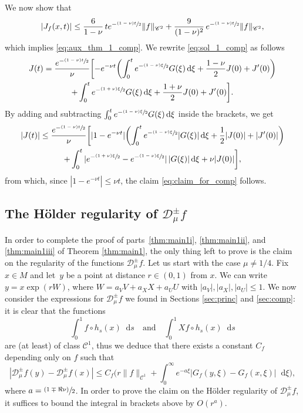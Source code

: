 \documentclass[11pt]{article}
\newcommand{\psfrac}[2]{\sfrac{(#1)}{#2}}
\newcommand{\tpsfrac}[3]{\sfrac{(#1)#3}{#2}}
\newcommand*{\diff}{\mathop{}\!\mathrm{d}}
\newcommand{\Dpm}[1]{\mathcal{D}_\mu^{\pm} #1}
\theoremstyle{definition}
\begin{document}
We now show that
\begin{equation}\label{eq:claim_for_comp}
|J_f(x,t)|\leq \frac{6}{1-\nu}\, t e^{-\tpsfrac{1-\nu}{2}t} \|f\|_{\mathscr{C}^2} + \frac{9}{(1-\nu)^2}\, e^{-\tpsfrac{1-\nu}{2}t} \|f\|_{\mathscr{C}^2},
\end{equation}
which implies \eqref{eq:aux_thm_1_comp}.
We rewrite \eqref{eq:sol_1_comp} as follows
\begin{multline*}
J(t) = \frac{e^{-\tpsfrac{1-\nu}{2}t}}{\nu} \biggl[- e^{-\nu t} \biggl(\int_0^t e^{-\tpsfrac{1-\nu}{2}\xi} G(\xi) \diff \xi + \frac{1-\nu}{2} J(0)+J'(0) \biggr) \\
+ \int_0^t e^{-\tpsfrac{1+\nu}{2}\xi} G(\xi) \diff \xi + \frac{1+\nu}{2} J(0) + J'(0) \biggr].
\end{multline*}
By adding and subtracting $\int_0^t e^{-\tpsfrac{1-\nu}{2}\xi} G(\xi) \diff \xi$ inside the brackets, we get
\begin{multline*}
|J(t)|\leq \frac{e^{-\tpsfrac{1-\nu}{2}t}}{\nu} \biggl[|1 - e^{-\nu t}|\biggl(\int_0^t e^{-\tpsfrac{1-\nu}{2}\xi} |G(\xi)|\diff \xi + \frac{1}{2} |J(0)|+|J'(0)|\biggr) \\
+ \int_0^t |e^{-\tpsfrac{1+\nu}{2}\xi} - e^{-\tpsfrac{1-\nu}{2}\xi}|\, |G(\xi)|\diff \xi + \nu |J(0)|\biggr],
\end{multline*}
from which, since $|1-e^{-\nu t}|\leq \nu t$, the claim \eqref{eq:claim_for_comp} follows.


\subsection{The Hölder regularity of $\Dpm{f}$}

In order to complete the proof of parts~\eqref{thm:main1i}, \eqref{thm:main1ii}, and \eqref{thm:main1iii} of Theorem \ref{thm:main1}, the only thing left to prove is the claim on the regularity of the functions $\Dpm{f}$.
Let us start with the case $\mu \neq 1/4$.
Fix $x \in M$ and let~$y$ be a point at distance $r \in (0,1)$ from $x$. We can write $y = x \exp(rW)$, where \hbox{$W = a_VV+a_XX+a_UU$} with $|a_V|, |a_X|, |a_U|\leq 1$.
We now consider the expressions for $\Dpm{f}$ we found in Sections \ref{sec:princ} and \ref{sec:comp}:
it is clear that the functions
\[
\int_0^1 f \circ h_s(x) \diff s \quad\text{and}\quad \int_0^1 Xf \circ h_s(x) \diff s
\]
are (at least) of class $\mathscr{C}^1$, thus we deduce that there exists a constant $C_f$ depending only on $f$ such that
\[
|\Dpm{f}(y) - \Dpm{f}(x)|\leq C_{f} \biggl(r \|f\|_{\mathscr{C}^1} + \int_0^{\infty} e^{-a \xi} |G_{f}(y,\xi) -G_{f}(x,\xi) |\diff \xi \biggr),
\]
where $a = \psfrac{1\mp \Re \nu}{2}$.
In order to prove the claim on the Hölder regularity of $\Dpm{f}$, it suffices to bound the integral in brackets above by $O(r^a)$.
\end{document}

